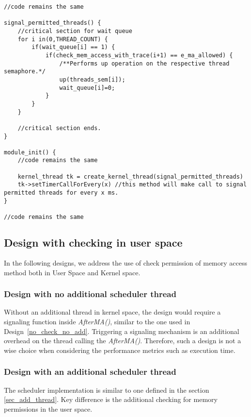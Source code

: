 \begin{lstlisting}[title=Kernel Space - General module definitions, style=customc]
//code remains the same

signal_permitted_threads() {
	//critical section for wait queue
	for i in(0,THREAD_COUNT) {
		if(wait_queue[i] == 1) {
			if(check_mem_access_with_trace(i+1) == e_ma_allowed) {
				/**Performs up operation on the respective thread semaphore.*/
				up(threads_sem[i]);
				wait_queue[i]=0;			
			}		
		}
	}	
	
	//critical section ends.
}

module_init() {
	//code remains the same
	
	kernel_thread tk = create_kernel_thread(signal_permitted_threads)
	tk->setTimerCallForEvery(x) //this method will make call to signal permitted threads for every x ms.
}

//code remains the same
\end{lstlisting}


\subsection{Design with checking in user space}

In the following designs, we address the use of check permission of memory access method both in User Space and Kernel space.

\subsubsection{Design with no additional scheduler thread}

Without an additional thread in kernel space, the design would require a signaling function inside \emph{AfterMA()}, similar to the one used in Design~\ref{no_check_no_add}. 
Triggering a signaling mechanism is an additional overhead on the thread calling the \emph{AfterMA()}. 
Therefore, such a design is not a wise choice when considering the performance metrics such as execution time.
 
\subsubsection{Design with an additional scheduler thread}

The scheduler implementation is similar to one defined in the section \ref{sec_add_thread}. 
Key difference is the additional checking for memory permissions in the user space. 

